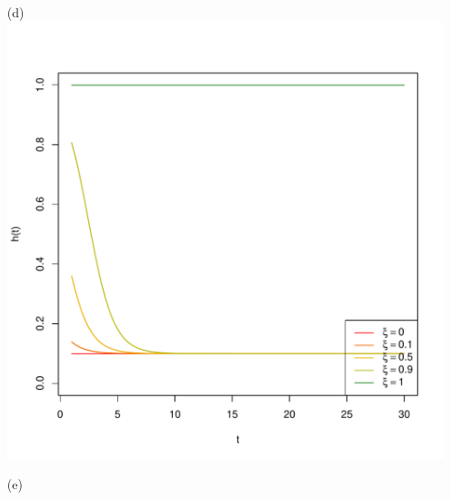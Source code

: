 \documentclass[paper=a4, fontsize=11pt]{scrartcl} %
\numberwithin{equation}{section} %
\numberwithin{figure}{section} %
\numberwithin{table}{section} %
\begin{document}
\begin{itemize}
	\item[(d)] 	\ \\ \includegraphics[width = .6\textwidth]{f_5_2_d.pdf}
	\item[(e)] 
\end{itemize}
\end{document}
